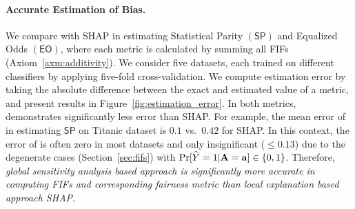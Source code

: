 \paragraph{Accurate Estimation of Bias.} We compare {\fairXplainer} with SHAP in estimating Statistical Parity $(\mathsf{SP})$ and Equalized Odds $(\mathsf{EO})$, where each metric is calculated by summing all FIFs (Axiom~\ref{axm:additivity}). We consider five datasets, each trained on different classifiers by applying five-fold cross-validation. We compute estimation error by taking the absolute difference between the exact and  estimated value of a metric, and present results in Figure~\ref{fig:estimation_error}. In both metrics, {\fairXplainer} demonstrates significantly less error than SHAP. For example, the mean error of {\fairXplainer} in estimating $ \mathsf{SP} $ on Titanic dataset is $ 0.1 $ vs.\ $ 0.42 $ for SHAP. In this context, the error of {\fairXplainer} is often zero in most datasets and only insignificant ($ \le 0.13 $) due to the degenerate cases (Section~\ref{sec:fifs}) with $ \Pr[\widehat{Y} = 1 | \mathbf{A} = \mathbf{a}] \in \{0, 1\} $.  Therefore, \emph{global sensitivity analysis based approach {\fairXplainer} is significantly more accurate in computing FIFs and corresponding fairness metric than local explanation based approach SHAP}.


